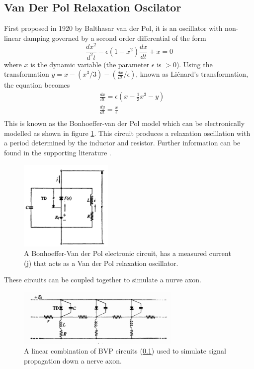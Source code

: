 \subsection{Van Der Pol Relaxation Oscilator}
\label{appendixVDP}
First proposed in 1920 by Balthasar van der Pol, it is an oscillator with non-linear damping governed by a second order differential of the form
\begin{equation}
    \frac{dx^2}{d^2t}-\epsilon(1-x^2)\frac{dx}{dt}+x=0
\end{equation}
where $x$ is the dynamic variable (the parameter $\epsilon$ is $>0$). Using the transformation $y=x-(x^3/3)-(\frac{dx}{dt}/\epsilon)$, known as Liénard's transformation, the equation becomes
\begin{equation}
    \begin{split}
        & \frac{dx}{dt}=\epsilon(x-\frac{1}{3}x^3-y) \\
        & \frac{dy}{dt}=\frac{x}{\epsilon} \\
    \end{split}
\end{equation}
This is known as the Bonhoeffer-van der Pol model which can be electronically modelled as shown in figure \ref{fig3.2}. This circuit produces a relaxation oscillation with a period determined by the inductor and resistor. Further information can be found in the supporting literature \citep{vdp}.
\begin{figure}
    \centering
    \includegraphics[width=0.4\textwidth]{images/BVP.png}
    \caption{A Bonhoeffer-Van der Pol electronic circuit, has a measured current (j) that acts as a Van der Pol relaxation oscillator. \citep{fitzhughnagumo}}
    \label{fig3.2}
\end{figure}
These circuits can be coupled together to simulate a nurve axon.
\begin{figure}
    \centering
    \includegraphics[width=0.7\textwidth]{images/FNaxon.png}
    \caption{A linear combination of BVP circuits (\ref{appendixVDP}) used to simulate signal propagation down a nerve axon. \citep{fitzhughnagumo}}
    \label{fig3.3}
\end{figure}

